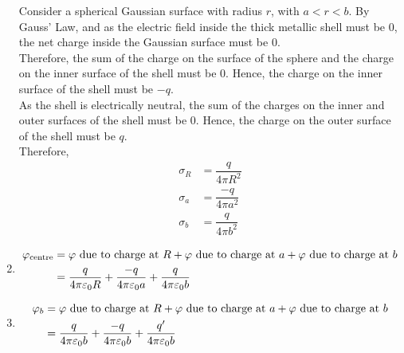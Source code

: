 \documentclass[fleqn, a4paper, 11pt, oneside]{amsart}
\theoremstyle{definition}
\theoremstyle{theorem}
\begin{document}
\begin{solution}
\begin{enumerate}[leftmargin=*]
\begin{figure}[H]
			\end{figure}
			Consider a spherical Gaussian surface with radius $r$, with $a < r < b$.
			By Gauss' Law, and as the electric field inside the thick metallic shell must be $0$, the net charge inside the Gaussian surface must be $0$.\\
			Therefore, the sum of the charge on the surface of the sphere and the charge on the inner surface of the shell must be $0$.
			Hence, the charge on the inner surface of the shell must be $-q$.\\
			As the shell is electrically neutral, the sum of the charges on the inner and outer surfaces of the shell must be $0$.
			Hence, the charge on the outer surface of the shell must be $q$.\\
			Therefore,
			\begin{align*}
				\sigma_R &= \dfrac{q}{4 \pi R^2}\\
				\sigma_a &= \dfrac{-q}{4 \pi a^2}\\
				\sigma_b &= \dfrac{q}{4 \pi b^2}
			\end{align*}
		\item
			\begin{align*}
				\varphi_{\textnormal{centre}} & = \textnormal{$\varphi$ due to charge at $R$} + \textnormal{$\varphi$ due to charge at $a$} + \textnormal{$\varphi$ due to charge at $b$} \\
                                                              & = \dfrac{q}{4 \pi \varepsilon_0 R}            + \dfrac{-q}{4 \pi \varepsilon_0 a}           + \dfrac{q}{4 \pi \varepsilon_0 b}
			\end{align*}
		\item
			\begin{align*}
				\varphi_b & = \textnormal{$\varphi$ due to charge at $R$} + \textnormal{$\varphi$ due to charge at $a$} + \textnormal{$\varphi$ due to charge at $b$} \\
                                          & = \dfrac{q}{4 \pi \varepsilon_0 b}            + \dfrac{-q}{4 \pi \varepsilon_0 b}           + \dfrac{q'}{4 \pi \varepsilon_0 b}                                \\

\end{align*}
\end{enumerate}
\end{solution}
\end{document}
